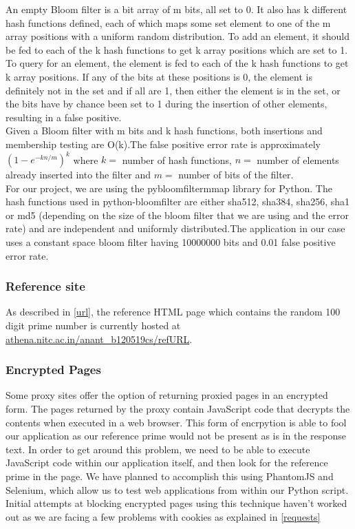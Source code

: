 \documentclass[a4paper,11pt,twocolumn]{article}
\begin{document}
	An empty Bloom filter is a bit array of m bits, all set to 0. It also has k different hash functions defined, each of which maps some set element to one of the m array positions with a uniform random distribution. To add an element, it should be fed to each of the k hash functions to get k array positions which are set to 1. To query for an element, the element is fed to each of the k hash functions to get k array positions. If any of the bits at these positions is 0, the element is definitely not in the set and if all are 1, then either the element is in the set, or the bits have by chance been set to 1 during the insertion of other elements, resulting in a false positive.\\

	Given a Bloom filter with m bits and k hash functions, both insertions and membership testing are O(k).The false positive error rate is approximately $ (1-e^{-kn/m})^{k} $  where $k =$ number of hash functions, $n =$ number of elements already inserted into the filter and $m =$ number of bits of the filter.\\

	For our project, we are using the pybloomfiltermmap library for Python. The hash functions used in python-bloomfilter are either sha512, sha384, sha256, sha1 or md5 (depending on the size of the bloom filter that we are using and the error rate) and are independent and uniformly distributed.The application in our case uses a constant space bloom filter having 10000000 bits and 0.01 false positive error rate.

\subsubsection{Reference site}
As described in \ref{url}, the reference HTML page which contains the random 100 digit prime number is currently hosted at \url{athena.nitc.ac.in/anant_b120519cs/refURL}. 

\subsubsection{Encrypted Pages} \label{enc_page}
Some proxy sites offer the option of returning proxied pages in an encrypted form. The pages returned by the proxy contain JavaScript code that decrypts the contents when executed in a web browser. This form of encrpytion is able to fool our application as our reference prime would not be present as is in the response text. In order to get around this problem, we need to be able to execute JavaScript code within our application itself, and then look for the reference prime in the page. We have planned to accomplish this using PhantomJS and Selenium, which allow us to test web applications from within our Python script. Initial attempts at blocking encrypted pages using this technique haven't worked out as we are facing a few problems with cookies as explained in \ref{requests}
\end{document}
